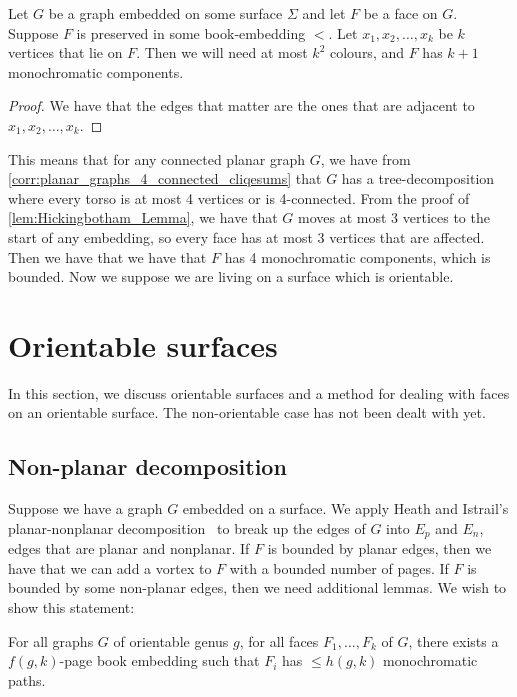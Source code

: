 \begin{theorem}\label{thm:embedded_graph}
	Let \( G \) be a graph embedded on some surface \(\Sigma \) and let \(F\) be a face on \(G\). Suppose \(F \) is preserved in some book-embedding \( < \). Let \(x_1, x_2, \ldots, x_k \) be \(k \) vertices that lie on \(F \). Then we will need at most \( k^2 \) colours, and \(F\) has \(k + 1 \) monochromatic components.
\end{theorem}

\begin{proof}
	We have that the edges that matter are the ones that are adjacent to \(x_1, x_2, \ldots, x_k \).
\end{proof}


This means that for any connected planar graph \(G \), we have from \cref{corr:planar_graphs_4_connected_cliqesums} that \(G\) has a tree-decomposition where every torso is at most 4 vertices or is 4-connected. From the proof of \cref{lem:Hickingbotham_Lemma}, we have that \(G\) moves at most 3 vertices to the start of any embedding, so every face has at most 3 vertices that are affected. Then we have that we have that \(F \) has 4 monochromatic components, which is bounded. Now we suppose we are living on a surface which is orientable.

\section{Orientable surfaces}
In this section, we discuss orientable surfaces and a method for dealing with faces on an orientable surface. The non-orientable case has not been dealt with yet. 
\subsection{Non-planar decomposition}
Suppose we have a graph \(G\) embedded on a surface. We apply Heath and Istrail's planar-nonplanar decomposition~\cite{heathPagenumberGenusGraphs1992} to break up the edges of \(G\) into \(E_p\) and \(E_n\), edges that are planar and nonplanar. If \(F\) is bounded by planar edges, then we have that we can add a vortex to \(F\) with a bounded number of pages. If \(F\) is bounded by some non-planar edges, then we need additional lemmas.
We wish to show this statement:
\begin{theorem}
	For all graphs \(G\) of orientable genus \(g\), for all faces \(F_1, \ldots, F_k\) of \(G\), there exists a \(f(g, k)\)-page book embedding such that \(F_i\) has \(\leq h(g, k)\) monochromatic paths.
\end{theorem}


